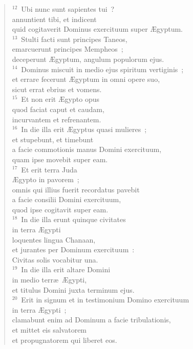 \begin{verse}
${}^{12}$~Ubi nunc sunt sapientes tui~?\\ annuntient tibi, et indicent\\ quid cogitaverit Dominus exercituum super \AE gyptum.\\
${}^{13}$~Stulti facti sunt principes Taneos,\\ emarcuerunt principes Mempheos~;\\ deceperunt \AE gyptum, angulum populorum ejus.\\
${}^{14}$~Dominus miscuit in medio ejus spiritum vertiginis~;\\ et errare fecerunt \AE gyptum in omni opere suo,\\ sicut errat ebrius et vomens.\\
${}^{15}$~Et non erit \AE gypto opus\\ quod faciat caput et caudam,\\ incurvantem et refrenantem.\\
${}^{16}$~In die illa erit \AE gyptus quasi mulieres~;\\ et stupebunt, et timebunt\\ a facie commotionis manus Domini exercituum,\\ quam ipse movebit super eam.\\
${}^{17}$~Et erit terra Juda\\ \AE gypto in pavorem~;\\ omnis qui illius fuerit recordatus pavebit\\ a facie consilii Domini exercituum,\\ quod ipse cogitavit super eam.\\
${}^{18}$~In die illa erunt quinque civitates\\ in terra \AE gypti\\ loquentes lingua Chanaan,\\ et jurantes per Dominum exercituum~:\\ Civitas solis vocabitur una.\\
${}^{19}$~In die illa erit altare Domini\\ in medio terr\ae\ \AE gypti,\\ et titulus Domini juxta terminum ejus.\\
${}^{20}$~Erit in signum et in testimonium Domino exercituum\\ in terra \AE gypti~;\\ clamabunt enim ad Dominum a facie tribulationis,\\ et mittet eis salvatorem\\ et propugnatorem qui liberet eos.\\

\end{verse}
